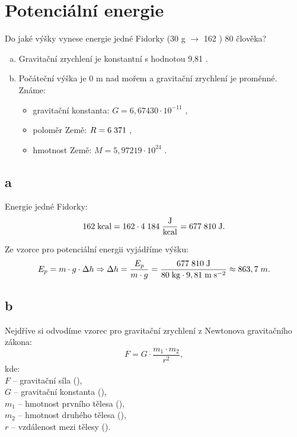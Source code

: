 \documentclass{article}
\begin{document}
\maketitle
\tableofcontents
\newpage



\section{ Potenciální energie \spicy}
Do jaké výšky vynese energie jedné Fidorky (30 g $\rightarrow$ 162 \ueqKCAL) 80 \ueqKG \fs člověka?

\begin{enumerate}[a)]
    \item Gravitační zrychlení je konstantní s hodnotou 9,81 \ueqMandSinvsq.
    \item Počáteční výška je 0 m nad mořem a gravitační zrychlení je proměnné. Známe:
          \begin{itemize}
              \item gravitační konstanta: $G = 6,67430 \cdot 10^{-11}$ \ueqNandMsqKGinvsq,
              \item poloměr Země: $R = 6 \; 371$ \ueqKM,
              \item hmotnost Země: $M = 5,97219 \cdot 10^{24}$ \ueqKG.
          \end{itemize}
\end{enumerate}


\subsection{a}
Energie jedné Fidorky:
$$
    162 \; \textrm{kcal} = 162 \cdot 4 \; 184 \; \frac{\textrm{J}}{\textrm{kcal}} = 677 \; 810 \; \textrm{J}.
$$

Ze vzorce pro potenciální energii vyjádříme výšku:
$$
    E_p = m \cdot g \cdot \Delta h \Rightarrow \Delta h = \frac{E_p}{m \cdot g} = \frac{677 \; 810 \; \textrm{J}}{80 \; \textrm{kg} \cdot 9,81 \; \textrm{m} \; \textrm{s}^{-2}} \approx 863,7 \; m.
$$


\subsection{b \spicy \spicy \spicy}
Nejdříve si odvodíme vzorec pro gravitační zrychlení z Newtonova gravitačního zákona:
$$
    F = G \cdot \frac{m_1 \cdot m_2}{r^2},
$$
kde:\\
$F$ -- gravitační síla (\ueqN),\\
$G$ -- gravitační konstanta (\ueqNandMsqKGinvsq),\\
$m_1$ -- hmotnost prvního tělesa (\ueqKG),\\
$m_2$ -- hmotnost druhého tělesa (\ueqKG),\\
$r$ -- vzdálenost mezi tělesy (\ueqM).\\
\end{document}
